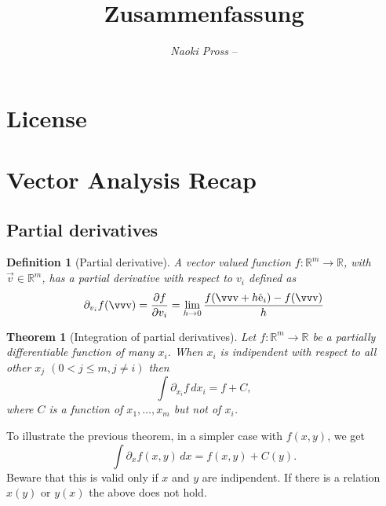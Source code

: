 \documentclass[margin=small]{tex/hsrzf}
\author{\textsl{Naoki Pross} -- \texttt{\theauthoremail}}
\title{\texttt{\themodule} Zusammenfassung}
\date{\thesemester}
\theoremstyle{elmagzf}
\newtheorem{theorem}{Theorem}
\newtheorem{definition}{Definition}
\begin{document}

\maketitle


\tableofcontents

\section*{License}
\doclicenseThis

\clearpage
\twocolumn
\setcounter{page}{1}

\section{Vector Analysis Recap}

\subsection{Partial derivatives}

\begin{definition}[Partial derivative]
  A vector valued function \(f: \mathbb{R}^m\to\mathbb{R}\), with
  \(\vec{v}\in\mathbb{R}^m\), has a partial derivative with respect to \(v_i\)
  defined as
  \[
    \partial_{v_i} f(\vec{v})
      = \frac{\partial f}{\partial v_i}
      = \lim_{h\to 0} \frac{f(\vec{v} + h\uvec{e}_i) - f(\vec{v})}{h}
  \]
\end{definition}

\begin{theorem}[Integration of partial derivatives]
  Let \(f: \mathbb{R}^m\to\mathbb{R}\) be a partially differentiable function
  of many \(x_i\). When \(x_i\) is \emph{indipendent} with respect to all other
  \(x_j\) \((0 < j \leq m, j \neq i)\) then
  \[
    \int \partial_{x_i} f \,d x_i = f + C,
  \]
  where \(C\) is a function of \(x_1, \ldots, x_m\) but not of \(x_i\).
\end{theorem}

To illustrate the previous theorem, in a simpler case with \(f(x,y)\), we get
\[
  \int \partial_x f(x,y) \,dx = f(x, y) + C(y).
\]
Beware that this is valid only if \(x\) and \(y\) are indipendent.
If there is a relation \(x(y)\) or \(y(x)\) the above does not hold.
\end{document}
